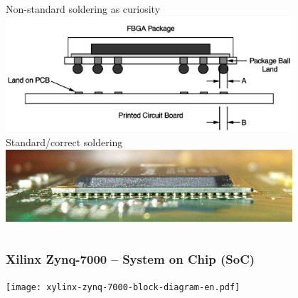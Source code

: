 \documentclass{beamer}
\begin{document}
\begin{frame}
\begin{columns}
\begin{column}{0.5\textwidth}
\begin{center}
    Non-standard soldering as curiosity 
    \newline
    \includegraphics[width=0.8\textwidth]{fig/bga-dimensions-diagram.png}
    \newline
    Standard/correct soldering
    \newline
    \includegraphics[width=0.8\textwidth]{fig/bga-soldering-proper.jpg}
  \end{center}
\end{column}
\end{columns}

\end{frame}

\begin{frame}
\frametitle{Xilinx Zynq-7000 -- System on Chip (SoC)}
  \begin{center}
    \texttt{[image: xylinx-zynq-7000-block-diagram-en.pdf]}
  \end{center}
\end{frame}
\end{document}
